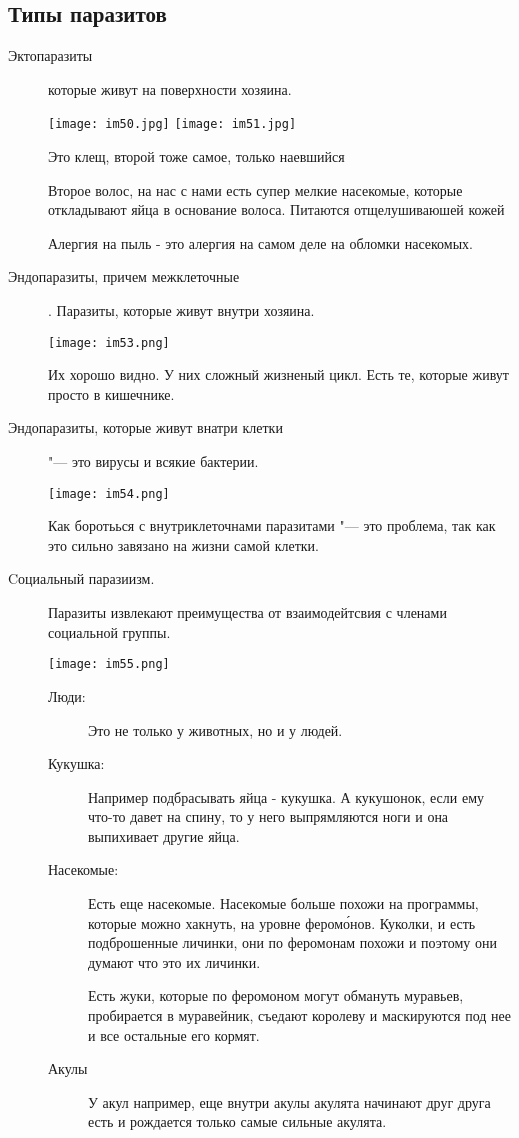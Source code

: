 \subsection{Типы паразитов}
\begin{description}
\item[Эктопаразиты] которые живут на поверхности 
хозяина.

\texttt{[image: im50.jpg]}
\texttt{[image: im51.jpg]}

Это клещ, второй тоже самое, только наевшийся

Второе волос, на нас с нами есть супер мелкие насекомые, 
которые откладывают яйца в основание волоса. Питаются отщелушиваюшей кожей

Алергия на пыль - это алергия на самом деле на 
обломки насекомых.

\item[Эндопаразиты, причем межклеточные]. Паразиты, которые живут 
внутри хозяина. 

\texttt{[image: im53.png]}



Их хорошо видно. У них 
сложный жизненый цикл. Есть те, которые живут просто в кишечнике.
\item[Эндопаразиты, которые живут внатри клетки] "--- это вирусы и всякие бактерии. 

\texttt{[image: im54.png]}

Как боротьься с внутриклеточнами паразитами "--- это проблема, так как 
это сильно завязано на жизни самой клетки. 

\item[Cоциальный паразиизм.]  Паразиты извлекают преимущества от взаимодейтсвия с членами социальной группы. 

\texttt{[image: im55.png]}

\begin{description}
\item[Люди:] Это не только у животных, но и у людей. 

\item[Кукушка:] Например подбрасывать яйца - кукушка. 
А кукушонок, если ему что-то давет на спину, то у него выпрямляются ноги и она выпихивает
другие яйца.


\item[Насекомые:] Есть еще насекомые. Насекомые больше похожи на программы, которые можно хакнуть, 
на уровне феромо́нов. 
Куколки, и есть подброшенные личинки, они по феромонам похожи и поэтому
они думают что это их личинки.

Есть жуки, которые по феромоном могут обмануть муравьев, пробирается в муравейник, съедают королеву и
маскируются под нее и все остальные его кормят.


\item[Акулы]У акул например, еще внутри акулы акулята начинают друг друга есть и
рождается только самые сильные акулята.

\end{description}
\end{description}

